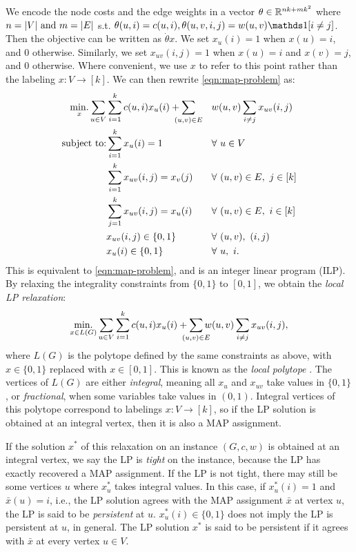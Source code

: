 We encode the node costs and the edge weights in a vector $\theta \in \mathbb{R}^{nk + mk^2}$ where $n = |V| \text{ and } m = |E|$ s.t. $\theta(u,i) = c(u,i), \theta(u,v,i,j) = w(u,v)\indicator[i \ne j]$. Then the objective can be written as $\dot{\theta}{x}$. We set $x_u(i) = 1$ when $x(u) = i$, and 0 otherwise. Similarly, we set $x_{uv}(i,j) = 1$ when $x(u) = i$ and $x(v) = j$, and 0 otherwise. Where convenient, we use $x$ to refer to this point rather than the labeling $x: V \to [k]$.
We can then rewrite \eqref{eqn:map-problem} as:
\begin{alignat*}{2}
  \mindot_{x}\sum_{u\in V}&\sum_{i=1}^k c(u,i)x_u(i) + \smashoperator{\sum_{(u,v) \in E}}\ \ &&w(u,v)\sum_{i\ne j}x_{uv}(i,j)\\
  \text{subject to:}& \sum_{i=1}^k x_u(i) = 1 &&\forall\ u\in V\\
                    & \sum_{i=1}^k x_{uv}(i,j) = x_v(j)&& \forall\ (u,v)\in E,\ j\in [k]\\
                   & \sum_{j=1}^k x_{uv}(i,j) = x_u(i)&& \forall\ (u,v)\in E,\ i\in [k]\\
                   & x_{uv}(i,j) \in \{0,1\}&&\forall\ (u,v),\ (i,j)\\
                   & x_{u}(i) \in \{0,1\}&& \forall\ u,\ i.
\end{alignat*}
This is equivalent to \eqref{eqn:map-problem}, and is an integer linear program (ILP). By relaxing the integrality constraints from $\{0,1\}$ to $[0,1]$, we obtain the \emph{local LP relaxation}:
\begin{alignat*}{2}
  \mindot_{x\in L(G)}\sum_{u\in V}\sum_{i=1}^k c(u,i)x_u(i) + \smashoperator{\sum_{(u,v) \in E}}w(u,v)\sum_{i\ne j}x_{uv}(i,j),
\end{alignat*}
where $L(G)$ is the polytope defined by the same constraints as above, with $x \in \{0,1\}$ replaced with $x \in [0,1]$. This is known as the \emph{local polytope} \cite{wainwright2008graphical}. The vertices of $L(G)$ are either \emph{integral}, meaning all $x_u$ and $x_{uv}$ take values in $\{0,1\}$, or \emph{fractional}, when some variables take values in $(0,1)$. 
Integral vertices of this polytope correspond to labelings ${x: V\to [k]}$, so if the LP solution is obtained at an integral vertex, then it is also a MAP assignment.

If the solution $x^*$ of this relaxation on an instance $(G,c,w)$ is obtained at an integral vertex, we say the LP is \emph{tight} on the instance, because the LP has exactly recovered a MAP assignment. If the LP is not tight, there may still be some vertices $u$ where $x^*_u$ takes integral values. In this case, if $x^*_u(i) = 1$ and $\bar{x}(u) = i$, i.e., the LP solution agrees with the MAP assignment $\bar{x}$ at vertex $u$, the LP is said to be \emph{persistent} at $u$. $x^*_u(i) \in \{0,1\}$ does not imply the LP is persistent at $u$, in general. The LP solution $x^*$ is said to be persistent if it agrees with $\bar{x}$ at every vertex $u \in V$. 

